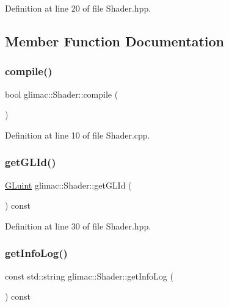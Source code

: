 Definition at line 20 of file Shader.\+hpp.



\subsection{Member Function Documentation}
\mbox{\label{classglimac_1_1_shader_a1e6c6814a6275dd698b3befdb89aa647}} 
\subsubsection{\texorpdfstring{compile()}{compile()}}
{\footnotesize\ttfamily bool glimac\+::\+Shader\+::compile (\begin{DoxyParamCaption}{ }\end{DoxyParamCaption})}



Definition at line 10 of file Shader.\+cpp.

\mbox{\label{classglimac_1_1_shader_a46c21c4b6b9ee89426b458695897202e}} 
\subsubsection{\texorpdfstring{get\+G\+L\+Id()}{getGLId()}}
{\footnotesize\ttfamily \hyperlink{dummy_8cpp_aa311c7f0d6ec4f1a33f9235c3651b86b}{G\+Luint} glimac\+::\+Shader\+::get\+G\+L\+Id (\begin{DoxyParamCaption}{ }\end{DoxyParamCaption}) const\hspace{0.3cm}{\ttfamily [inline]}}



Definition at line 30 of file Shader.\+hpp.

\mbox{\label{classglimac_1_1_shader_aa0de6702041087187d8eca874000cfa6}} 
\subsubsection{\texorpdfstring{get\+Info\+Log()}{getInfoLog()}}
{\footnotesize\ttfamily const std\+::string glimac\+::\+Shader\+::get\+Info\+Log (\begin{DoxyParamCaption}{ }\end{DoxyParamCaption}) const}



